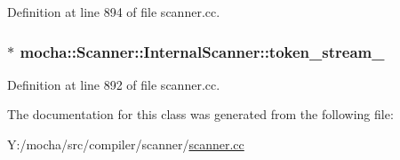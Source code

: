 Definition at line 894 of file scanner.cc.

\hypertarget{classmocha_1_1_scanner_1_1_internal_scanner_a61da9ebc53fe5bc26886f8cebb11fbb6}{
\subsubsection[{token\_\-stream\_\-}]{$\ast$ {\bf mocha::Scanner::InternalScanner::token\_\-stream\_\-}}}
\label{classmocha_1_1_scanner_1_1_internal_scanner_a61da9ebc53fe5bc26886f8cebb11fbb6}


Definition at line 892 of file scanner.cc.



The documentation for this class was generated from the following file:\begin{DoxyCompactItemize}
\item 
Y:/mocha/src/compiler/scanner/\hyperlink{scanner_8cc}{scanner.cc}\end{DoxyCompactItemize}
